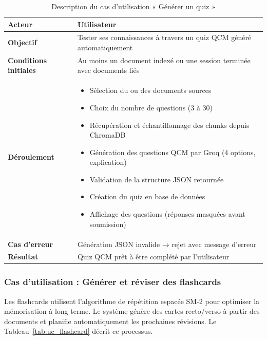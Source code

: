 \begin{table}[H]
\centering
\renewcommand{\arraystretch}{1.2}
\begin{tabular}{|p{4cm}|p{10cm}|}
\hline
\textbf{Acteur} & Utilisateur \\ \hline

\textbf{Objectif} & Tester ses connaissances à travers un quiz QCM généré automatiquement \\ \hline

\textbf{Conditions initiales} & Au moins un document indexé ou une session terminée avec documents liés \\ \hline

\textbf{Déroulement} &
\begin{itemize}
    \item Sélection du ou des documents sources
    \item Choix du nombre de questions (3 à 30)
    \item Récupération et échantillonnage des chunks depuis ChromaDB
    \item Génération des questions QCM par Groq (4 options, explication)
    \item Validation de la structure JSON retournée
    \item Création du quiz en base de données
    \item Affichage des questions (réponses masquées avant soumission)
\end{itemize} \\ \hline

\textbf{Cas d'erreur} & Génération JSON invalide → rejet avec message d'erreur \\ \hline

\textbf{Résultat} & Quiz QCM prêt à être complété par l'utilisateur \\ \hline
\end{tabular}
\caption{Description du cas d'utilisation « Générer un quiz »}
\label{tab:uc_quiz}
\end{table}

\subsubsection{Cas d'utilisation : Générer et réviser des flashcards}

Les flashcards utilisent l'algorithme de répétition espacée SM-2 pour optimiser la mémorisation à long terme. Le système génère des cartes recto/verso à partir des documents et planifie automatiquement les prochaines révisions. Le Tableau~\ref{tab:uc_flashcard} décrit ce processus.

